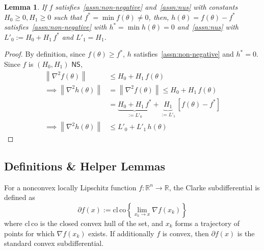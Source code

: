 \documentclass{article}
\newtheorem{lemma}{Lemma}
\newcommand{\norm}[1]{\left\|#1 \right\|}
\newcommand{\R}{\mathbb{R}}
\newcommand{\NS}{\textsf{NS}}
\begin{document}
\begin{lemma}
If $f$ satisfies~\cref{assn:non-negative} and~\cref{assn:nus} with constants $H_0 \geq 0, H_1 \geq 0$ such that $f^* = \min f(\theta) \neq 0$, then, $h(\theta) = f(\theta) - f^*$ satisfies~\cref{assn:non-negative} with $h^* = \min h(\theta) = 0$ and~\cref{assn:nus} with $L'_0 := H_0 + H_1 \, f^*$ and $L'_1 = H_1$.
\label{lemma:shift-nus}
\end{lemma}
\begin{proof}
By definition, since $f(\theta) \geq f^*$, $h$ satisfies~\cref{assn:non-negative} and $h^* = 0$. Since $f$ is $(H_0, H_1)$ $\NS$, 
\begin{align*}
\norm{\nabla^2 f(\theta)} & \leq H_0 + H_1 \, f(\theta) \\
\implies \norm{\nabla^2 h(\theta)} & = \norm{\nabla^2 f(\theta)} \leq H_0 + H_1 \, f(\theta) \\
& = \underbrace{H_0 + H_1 \, f^*}_{:= L'_0} + \underbrace{H_1}_{:= L'_1} \, [f(\theta) - f^*] \\
\implies \norm{\nabla^2 h(\theta)} & \leq L'_0 + L'_1 \, h(\theta)
\end{align*}
\end{proof}



\subsection{Definitions \& Helper Lemmas}

\begin{definition}
For a nonconvex locally Lipschitz function $f:\R^n\to\R$, the Clarke subdifferential is defined as 
\[
\partial f(x):=\mathrm{cl}\,\mathrm{co}\left\{\lim_{x_k\to x} \nabla f(x_k) \right\}
\]
where $\mathrm{cl}\,\mathrm{co}$ is the closed convex hull of the set, and $x_k$ forms a trajectory of points for which $\nabla f(x_k)$ exists. If additionally $f$ is convex, then $\partial f(x)$ is the standard convex subdifferential.
\end{definition}
\end{document}
